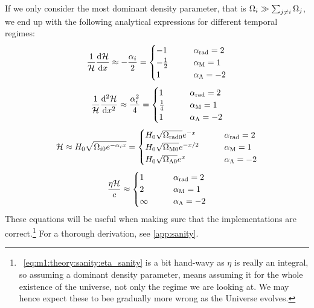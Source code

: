     If we only consider the most dominant density parameter, that is $\Omega_i \gg \sum_{j\neq i}\Omega_j$, we end up with the following analytical expressions for different temporal regimes:
    \begin{equation}
        \label{eq:m1:theory:sanity:first_deriv_sanity}
        \frac{1}{\mathcal{H}}\dv{\mathcal{H}}{x} \approx - \frac{\alpha_i}{2} = 
        \begin{cases}
            -1 \qquad &\alpha_\mathrm{rad} = 2 \\
            -\frac{1}{2} \qquad &\alpha_\mathrm{M} = 1\\
            1 \qquad &\alpha_\Lambda = -2
        \end{cases}
    \end{equation}
    \begin{equation}
        \label{eq:m1:theory:sanity:second_deriv_sanity}
        \frac{1}{\mathcal{H}}\dv[2]{\mathcal{H}}{x} \approx \frac{\alpha_i^2}{4} = 
        \begin{cases}
            1 \qquad &\alpha_\mathrm{rad} = 2 \\
            \frac{1}{4} \qquad &\alpha_\mathrm{M} = 1\\
            1 \qquad &\alpha_\Lambda = -2
        \end{cases}
    \end{equation}
    \begin{equation}
        \label{eq:m1:theory:sanity:conformal_hubble}
        \mathcal{H} \approx H_0\sqrt{\Omega_{i0}e^{-\alpha_ix}} = 
        \begin{cases}
            H_0\sqrt{\Omega_\mathrm{rad0}}e^{-x} \qquad &\alpha_\mathrm{rad} = 2 \\
            H_0\sqrt{\Omega_\mathrm{M0}}e^{-x/2} \qquad &\alpha_\mathrm{M} = 1\\
            H_0\sqrt{\Omega_{\Lambda0}}e^x \qquad &\alpha_\Lambda = -2
        \end{cases}
    \end{equation}
    \begin{equation}
        \label{eq:m1:theory:sanity:eta_sanity}
        \frac{\eta\mathcal{H}}{c} \approx 
        \begin{cases}
            1 \qquad &\alpha_\mathrm{rad} = 2 \\
            2 \qquad &\alpha_\mathrm{M} = 1\\
            \infty \qquad &\alpha_\Lambda = -2
        \end{cases}
    \end{equation}
    These equations will be useful when making sure that the implementations are correct.\footnote{~\cref{eq:m1:theory:sanity:eta_sanity} is a bit hand-wavy as $\eta$ is really an integral, so assuming a dominant density parameter, means assuming it for the whole existence of the universe, not only the regime we are looking at. We may hence expect these to bee gradually more wrong as the Universe evolves. } For a thorough derivation, see \cref{app:sanity}.



